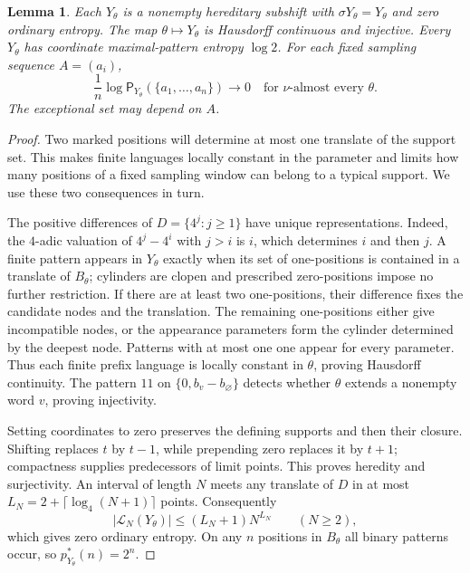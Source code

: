 \documentclass[11pt,reqno]{amsart}
\numberwithin{equation}{section}
\newtheorem{lemma}[theorem]{Lemma}
\theoremstyle{definition}
\theoremstyle{definition}
\newcommand{\Patt}{\mathsf P}
\begin{document}
\begin{lemma}\label{lem:sparse-bundle}
Each $Y_\theta$ is a nonempty hereditary subshift with
$\sigma Y_\theta=Y_\theta$ and zero ordinary entropy.
The map $\theta\mapsto Y_\theta$ is Hausdorff continuous and injective.
Every $Y_\theta$ has coordinate maximal-pattern entropy $\log2$.
For each fixed sampling sequence $A=(a_i)$,
\[
 \frac1n\log\Patt_{Y_\theta}(\{a_1,\ldots,a_n\})
 \longrightarrow0
 \quad\text{for }\nu\text{-almost every }\theta.
\]
The exceptional set may depend on $A$.
\end{lemma}
\begin{proof}
Two marked positions will determine at most one translate of the
support set. This makes finite languages locally constant in the
parameter and limits how many positions of a fixed sampling window
can belong to a typical support. We use these two consequences in
turn.

The positive differences of $D=\{4^j:j\ge1\}$ have unique
representations. Indeed, the $4$-adic valuation of
$4^j-4^i$ with $j>i$ is $i$, which determines $i$ and then $j$.
A finite pattern appears in $Y_\theta$ exactly when its set of
one-positions is contained in a translate of $B_\theta$;
cylinders are clopen and prescribed zero-positions impose no
further restriction. If there are at least two one-positions,
their difference fixes the candidate nodes and the translation.
The remaining one-positions either give incompatible nodes, or
the appearance parameters form the cylinder determined by the
deepest node. Patterns with at most one one appear for every
parameter. Thus each finite prefix language is locally constant
in $\theta$, proving Hausdorff continuity. The pattern $11$ on
$\{0,b_v-b_\varnothing\}$ detects whether $\theta$ extends a
nonempty word $v$, proving injectivity.

Setting coordinates to zero preserves the defining supports and
then their closure. Shifting replaces $t$ by $t-1$, while
prepending zero replaces it by $t+1$; compactness supplies
predecessors of limit points. This proves heredity and surjectivity.
An interval of length $N$ meets any translate of $D$ in at most
$L_N=2+\lceil\log_4(N+1)\rceil$ points. Consequently
\[
 |\mathcal L_N(Y_\theta)|
 \le (L_N+1)N^{L_N}\qquad(N\ge2),
\]
which gives zero ordinary entropy. On any $n$ positions in
$B_\theta$ all binary patterns occur, so $p_{Y_\theta}^*(n)=2^n$.


\end{proof}
\end{document}
